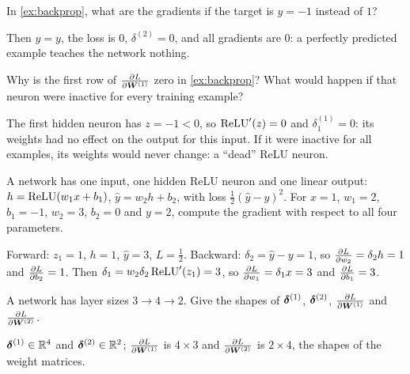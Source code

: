 \sectionexercises

\begin{exercise}
In \cref{ex:backprop}, what are the gradients if the target is $y = -1$ instead
of $1$?
\end{exercise}
\begin{solution}
Then $\hat y = y$, the loss is $0$, $\delta^{(2)} = 0$, and all gradients are $0$:
a perfectly predicted example teaches the network nothing.
\end{solution}

\begin{exercise}
Why is the first row of $\frac{\partial L}{\partial \bm{W}^{(1)}}$ zero in \cref{ex:backprop}? What
would happen if that neuron were inactive for every training example?
\end{exercise}
\begin{solution}
The first hidden neuron has $z = -1 < 0$, so $\operatorname{ReLU}'(z) = 0$ and $\delta_1^{(1)} = 0$:
its weights had no effect on the output for this input. If it were inactive for
all examples, its weights would never change: a ``dead'' ReLU neuron.
\end{solution}

\begin{exercise}
A network has one input, one hidden ReLU neuron and one linear output:
$h = \operatorname{ReLU}(w_1x + b_1)$, $\hat y = w_2h + b_2$, with loss $\frac12(\hat y - y)^2$. For
$x = 1$, $w_1 = 2$, $b_1 = -1$, $w_2 = 3$, $b_2 = 0$ and $y = 2$, compute the gradient
with respect to all four parameters.
\end{exercise}
\begin{solution}
Forward: $z_1 = 1$, $h = 1$, $\hat y = 3$, $L = \tfrac12$. Backward: $\delta_2 = \hat y -
y = 1$, so $\frac{\partial L}{\partial w_2} = \delta_2h = 1$ and $\frac{\partial L}{\partial b_2} = 1$. Then
$\delta_1 = w_2\delta_2\operatorname{ReLU}'(z_1) = 3$, so $\frac{\partial L}{\partial w_1} = \delta_1x = 3$ and
$\frac{\partial L}{\partial b_1} = 3$.
\end{solution}

\begin{exercise}
A network has layer sizes $3 \to 4 \to 2$. Give the shapes of $\bm{\delta}^{(1)}$,
$\bm{\delta}^{(2)}$, $\frac{\partial L}{\partial \bm{W}^{(1)}}$ and $\frac{\partial L}{\partial \bm{W}^{(2)}}$.
\end{exercise}
\begin{solution}
$\bm{\delta}^{(1)} \in \mathbb{R}^4$ and $\bm{\delta}^{(2)} \in \mathbb{R}^2$; $\frac{\partial L}{\partial \bm{W}^{(1)}}$ is
$4\times3$ and $\frac{\partial L}{\partial \bm{W}^{(2)}}$ is $2\times4$, the shapes of the weight
matrices.
\end{solution}

